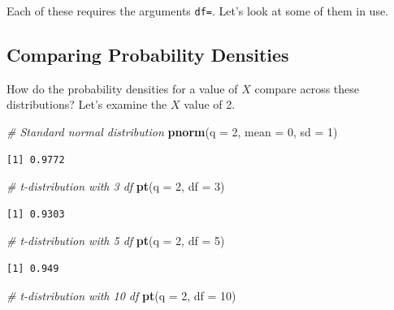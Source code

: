 \documentclass[]{book}
\newenvironment{Shaded}{\begin{snugshade}}{\end{snugshade}}
\newcommand{\CommentTok}[1]{\textcolor[rgb]{0.56,0.35,0.01}{\textit{#1}}}
\newcommand{\DataTypeTok}[1]{\textcolor[rgb]{0.13,0.29,0.53}{#1}}
\newcommand{\DecValTok}[1]{\textcolor[rgb]{0.00,0.00,0.81}{#1}}
\newcommand{\KeywordTok}[1]{\textcolor[rgb]{0.13,0.29,0.53}{\textbf{#1}}}
\newcommand{\NormalTok}[1]{#1}
\begin{document}
Each of these requires the arguments \texttt{df=}. Let's look at some of them in use.

\hypertarget{comparing-probability-densities}{%
\subsection{Comparing Probability Densities}\label{comparing-probability-densities}}

How do the probability densities for a value of \(X\) compare across these distributions? Let's examine the \(X\) value of 2.

\begin{Shaded}
\begin{Highlighting}[]
\CommentTok{# Standard normal distribution}
\KeywordTok{pnorm}\NormalTok{(}\DataTypeTok{q =} \DecValTok{2}\NormalTok{, }\DataTypeTok{mean =} \DecValTok{0}\NormalTok{, }\DataTypeTok{sd =} \DecValTok{1}\NormalTok{)}
\end{Highlighting}
\end{Shaded}

\begin{verbatim}
[1] 0.9772
\end{verbatim}

\begin{Shaded}
\begin{Highlighting}[]
\CommentTok{# t-distribution with 3 df}
\KeywordTok{pt}\NormalTok{(}\DataTypeTok{q =} \DecValTok{2}\NormalTok{, }\DataTypeTok{df =} \DecValTok{3}\NormalTok{)}
\end{Highlighting}
\end{Shaded}

\begin{verbatim}
[1] 0.9303
\end{verbatim}

\begin{Shaded}
\begin{Highlighting}[]
\CommentTok{# t-distribution with 5 df}
\KeywordTok{pt}\NormalTok{(}\DataTypeTok{q =} \DecValTok{2}\NormalTok{, }\DataTypeTok{df =} \DecValTok{5}\NormalTok{)}
\end{Highlighting}
\end{Shaded}

\begin{verbatim}
[1] 0.949
\end{verbatim}

\begin{Shaded}
\begin{Highlighting}[]
\CommentTok{# t-distribution with 10 df}
\KeywordTok{pt}\NormalTok{(}\DataTypeTok{q =} \DecValTok{2}\NormalTok{, }\DataTypeTok{df =} \DecValTok{10}\NormalTok{)}
\end{Highlighting}
\end{Shaded}
\end{document}
